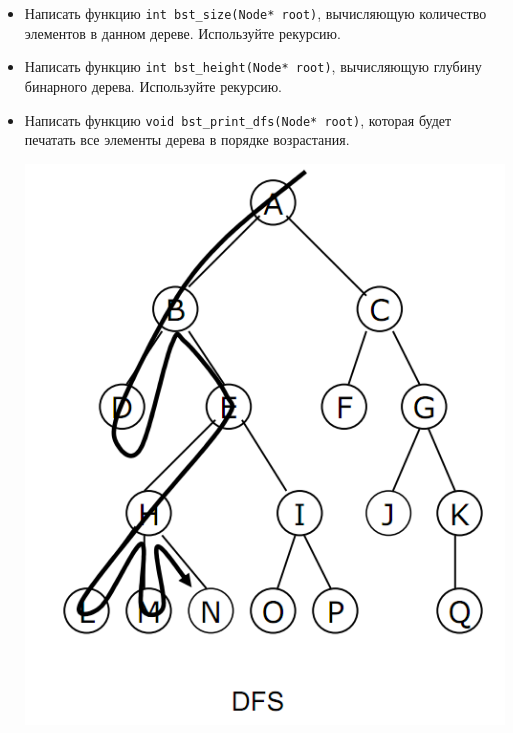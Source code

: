 \documentclass{article}
\begin{document}
\begin{itemize}
\item Написать функцию \texttt{int bst\_size(Node* root)}, вычисляющую количество элементов в данном дереве. Используйте рекурсию.
\item Написать функцию \texttt{int bst\_height(Node* root)}, вычисляющую глубину бинарного дерева. Используйте рекурсию.
\item Написать функцию \texttt{void bst\_print\_dfs(Node* root)}, которая будет печатать все элементы дерева в порядке возрастания.
\begin{multicols}{2}
\noindent
\begin{center}
\includegraphics[scale=0.24]{../images/dfs.png}
\end{center}
\columnbreak
\begin{center}

\end{center}
\end{multicols}
\end{itemize}
\end{document}
